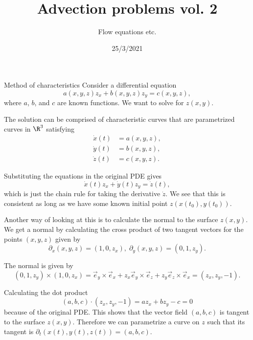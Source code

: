 

\title{Advection problems vol. 2}
\subtitle{Flow equations etc.}
\date{25/3/2021}
\date{}


	
	\maketitle
	

\begin{frame}{Method of characteristics}
	Consider a differential equation
	\[ a(x,y,z) z_x + b(x,y,z) z_y = c(x,y,z), \]
	where $ a $, $ b $, and $ c $ are known functions.
	We want to solve for $ z(x,y) $. 
	
	\pause
	The solution can be comprised of \alert{characteristic curves} that are parametrized curves in $ \R^3 $ satisfying 
	\[  
	\begin{split}
		\dot{x}(t) &= a(x,y,z), \\
		\dot{y}(t) &= b(x,y,z), \\
		\dot{z}(t) &= c(x,y,z).
	\end{split}
	\]
	
	\pause
	Substituting the equations in the original PDE gives
	\[ \dot{x}(t) z_x + \dot{y}(t) z_y = \dot{z}(t), \]
	which is just the chain rule for taking the derivative $ \dot{z} $. We see that this is consistent as long as we have some known initial point $ z(x(t_0),y(t_0)) $.
\end{frame}

\begin{frame}
	Another way of looking at this is to calculate the normal to the surface $ z(x,y) $. We get a normal by calculating the cross product of two tangent vectors for the points $ (x,y,z) $ given by 
	\[ \partial_x (x,y,z) = (1,0,z_x), \; \partial_y (x,y,z) = (0,1,z_y). \]
	
	\pause
	The normal is given by
	\[ (0,1,z_y) \times (1,0,z_x) = \vec{e}_y \times \vec{e}_x + z_x \vec{e}_y \times \vec{e}_z + z_y \vec{e}_z \times \vec{e}_x = (z_x,z_y,-1).  \]
	
	\pause
	Calculating the dot product 
	\[ (a,b,c) \cdot (z_x,z_y,-1) = a z_x + b z_y - c = 0 \]
	because of the original PDE. This shows that the vector field $ (a,b,c) $ is tangent to the surface $ z(x,y) $. Therefore we can parametrize a curve on $ z $ such that its tangent is $ \partial_t(x(t),y(t),z(t)) = (a,b,c) $.
\end{frame}

